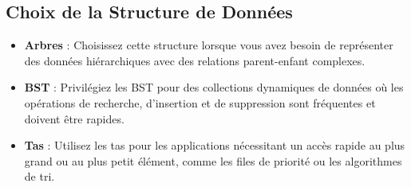 \subsection{Choix de la Structure de Données}\label{subsec:choix-de-la-structure-de-donnees}
\begin{itemize}
    \item \textbf{Arbres} : Choisissez cette structure lorsque vous avez besoin de représenter des données hiérarchiques avec des relations parent-enfant complexes.
    \item \textbf{BST} : Privilégiez les BST pour des collections dynamiques de données où les opérations de recherche, d'insertion et de suppression sont fréquentes et doivent être rapides.
    \item \textbf{Tas} : Utilisez les tas pour les applications nécessitant un accès rapide au plus grand ou au plus petit élément, comme les files de priorité ou les algorithmes de tri.
\end{itemize}